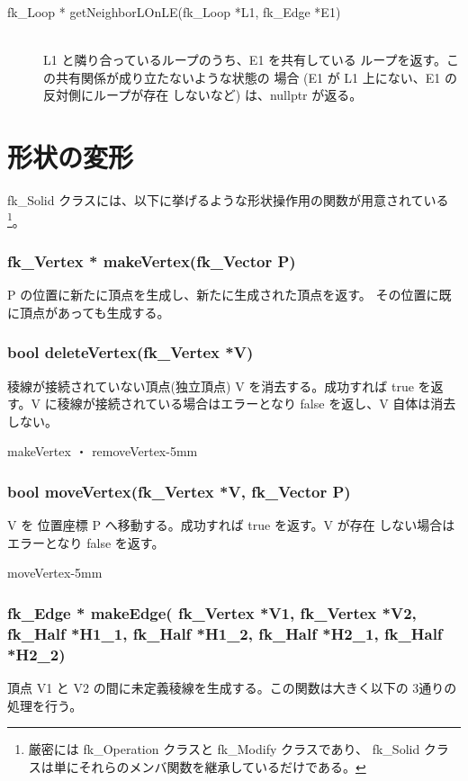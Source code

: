 \begin{description}
 \item[\hspace*{0.6cm}fk\_Loop *
	getNeighborLOnLE(fk\_Loop *L1, fk\_Edge *E1)] ~ \\
	L1 と隣り合っているループのうち、E1 を共有している
	ループを返す。この共有関係が成り立たないような状態の
	場合 (E1 が L1 上にない、E1 の反対側にループが存在
	しないなど) は、nullptr が返る。
\end{description}

\section{形状の変形} \label{sec:ModifySolid}
fk\_Solid クラスには、以下に挙げるような形状操作用の関数が用意されている
\footnote{厳密には fk\_Operation クラスと fk\_Modify クラスであり、
fk\_Solid クラスは単にそれらのメンバ関数を継承しているだけである。}。
 \subsubsection*{\hspace*{0.6cm}fk\_Vertex * makeVertex(fk\_Vector P)}
	P の位置に新たに頂点を生成し、新たに生成された頂点を返す。
	その位置に既に頂点があっても生成する。

 \subsubsection*{\hspace*{0.6cm}bool deleteVertex(fk\_Vertex *V)}
   	稜線が接続されていない頂点(独立頂点) V を消去する。成功すれば
	true を返す。V に稜線が接続されている場合はエラーとなり false
	を返し、V 自体は消去しない。

	{makeVertex ・ removeVertex}{-5mm}

 \subsubsection*{\hspace*{0.6cm}bool moveVertex(fk\_Vertex *V, fk\_Vector P)}
	V を 位置座標 P へ移動する。成功すれば true を返す。V が存在
	しない場合はエラーとなり false を返す。

	{moveVertex}{-5mm}

 \subsubsection*{\hspace*{0.6cm}fk\_Edge * makeEdge(
	fk\_Vertex *V1, fk\_Vertex *V2, \\ \hspace*{4.4cm}
	fk\_Half *H1\_1, fk\_Half *H1\_2,
	fk\_Half *H2\_1, fk\_Half *H2\_2)}
	頂点 V1 と V2 の間に未定義稜線を生成する。この関数は大きく以下の
	3通りの処理を行う。

